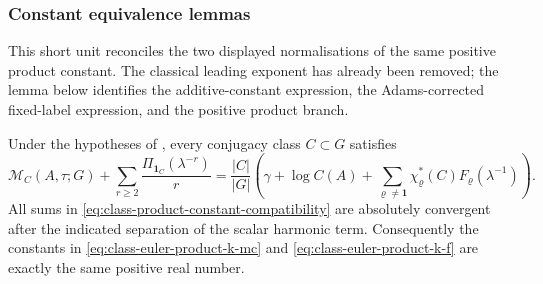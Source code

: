 \subsubsection{Constant equivalence lemmas}

This short unit reconciles the two displayed normalisations of the same
positive product constant.  The classical leading exponent has already been
removed; the lemma below identifies the additive-constant expression, the
Adams-corrected fixed-label expression, and the positive product branch.

\begin{lemma}
  \label{lem:class-product-constant-equivalence}
  Under the hypotheses of , every
  conjugacy class \(C\subset G\) satisfies
  \begin{equation}\label{eq:class-product-constant-compatibility}
    \mathcal M_C(A,\tau;G)
    +\sum_{r\ge2}\frac{\Pi_{\mathbf1_C}(\lambda^{-r})}{r}
    =
    \frac{|C|}{|G|}
    \left(
      \gamma+\log C(A)
      +\sum_{\varrho\neq\mathbf1}
        \chi_\varrho^\ast(C)F_\varrho(\lambda^{-1})
    \right).
  \end{equation}
  All sums in \eqref{eq:class-product-constant-compatibility} are
  absolutely convergent after the indicated separation of the scalar
  harmonic term. Consequently the constants in
  \eqref{eq:class-euler-product-k-mc} and
  \eqref{eq:class-euler-product-k-f} are exactly the same positive real
  number.
\end{lemma}

